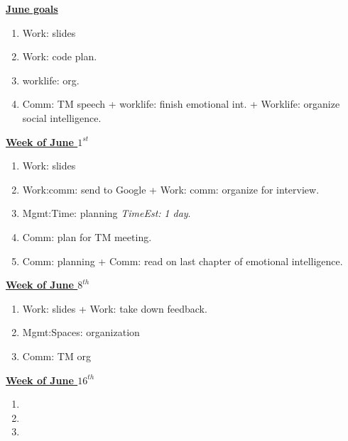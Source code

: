 \documentclass[serif, mathserif, final]{beamer}
\newcommand{\te}[1]{\textit{TimeEst:} \textit{#1}}
\begin{document}
\begin{frame}{}
\begin{columns}
\begin{column}{0.5\linewidth}
\begin{block}{\underline{\textbf{June goals}}} 
\begin{enumerate} 
  \small \item \small Work: slides 
  \small \item \small Work: code plan. 
  \item \small worklife: org. 
  \item \small Comm: TM speech + worklife: finish emotional int. + Worklife: organize
    social intelligence. 
\end{enumerate}
\end{block}

\begin{block}{\small \underline{\textbf{Week of June $1^{st}$}}}
\begin{enumerate}
\tiny \item \tiny Work: slides 
\item \tiny Work:comm: send to Google + Work: comm: organize for interview.
\item \tiny Mgmt:Time: planning \te{1 day}. 
\item \tiny Comm: plan for TM meeting.
\item \tiny Comm: planning + Comm: read on last chapter of emotional intelligence. 
\end{enumerate}
\end{block}


\begin{block}{\small \underline{\textbf{Week of June $8^{th}$}}}
\begin{enumerate}
\tiny \item \tiny Work: slides + Work: take down feedback. 
\item \tiny Mgmt:Spaces: organization
\item \tiny Comm: TM org 
\end{enumerate}
\end{block}

\begin{block}{\small \underline{\textbf{Week of June $16^{th}$}}}
\begin{enumerate}
\tiny \item \tiny 
\item \tiny 
\item \tiny 
\end{enumerate}
\end{block}


\end{column}
\end{columns}
\end{frame}
\end{document}
